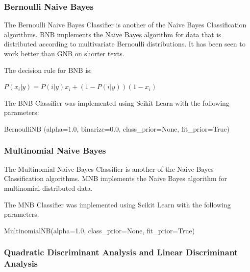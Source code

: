 \subsubsection*{Bernoulli Naive Bayes}

The Bernoulli Naive Bayes Classifier is another of the Naive Bayes Classification algorithms. BNB implements the Naive Bayes algorithm for data that is distributed according to multivariate Bernoulli distributions. It has been seen to work better than GNB on shorter texts.

The decision rule for BNB is:
\begin{center}
$P(x_i|y) = P(i|y)x_i + (1 - P(i|y))(1 - x_i)$
\end{center}

The BNB Classifier was implemented using Scikit Learn with the following parameters:

\begin{tcolorbox}
\begin{center}
	BernoulliNB (alpha=1.0, binarize=0.0, class\_prior=None, fit\_prior=True)
\end{center}
\end{tcolorbox}

\subsubsection*{Multinomial Naive Bayes}

The Multinomial Naive Bayes Classifier is another of the Naive Bayes Classification algorithms. MNB implements the Naive Bayes algorithm for multinomial distributed data.

The MNB Classifier was implemented using Scikit Learn with the following parameters:

\begin{tcolorbox}
\begin{center}
	MultinomialNB(alpha=1.0, class\_prior=None, fit\_prior=True)
\end{center}
\end{tcolorbox}

\subsubsection*{Quadratic Discriminant Analysis and Linear Discriminant Analysis}

